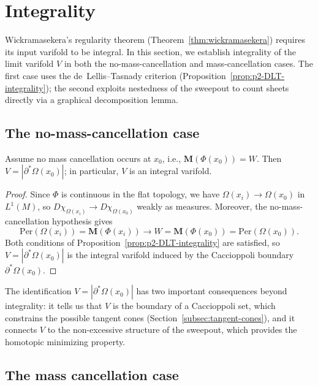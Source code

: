 
\section{Integrality}\label{sec:integrality}

Wickramasekera's regularity theorem (Theorem~\ref{thm:wickramasekera}) requires its input varifold to be integral. In this section, we establish integrality of the limit varifold $V$ in both the no-mass-cancellation and mass-cancellation cases. The first case uses the de~Lellis--Tasnady criterion (Proposition~\ref{prop:p2-DLT-integrality}); the second exploits nestedness of the sweepout to count sheets directly via a graphical decomposition lemma.

\subsection{The no-mass-cancellation case}\label{subsec:integrality-no-cancel}

\begin{theorem}\label{prop:limit-dichotomy}\label{thm:integrality-mult-one}
Assume no mass cancellation occurs at $x_0$, i.e., $\mathbf{M}(\Phi(x_0)) = W$. Then $V = |\partial^*\Omega(x_0)|$; in particular, $V$ is an integral varifold.
\end{theorem}

\begin{proof}
Since $\Phi$ is continuous in the flat topology, we have $\Omega(x_i) \to \Omega(x_0)$ in $L^1(M)$, so $D\chi_{\Omega(x_i)} \to D\chi_{\Omega(x_0)}$ weakly as measures. Moreover, the no-mass-cancellation hypothesis gives
\[
\mathrm{Per}(\Omega(x_i)) = \mathbf{M}(\Phi(x_i)) \to W = \mathbf{M}(\Phi(x_0)) = \mathrm{Per}(\Omega(x_0)).
\]
Both conditions of Proposition~\ref{prop:p2-DLT-integrality} are satisfied, so $V = |\partial^*\Omega(x_0)|$ is the integral varifold induced by the Caccioppoli boundary $\partial^*\Omega(x_0)$.
\end{proof}

The identification $V = |\partial^*\Omega(x_0)|$ has two important consequences beyond integrality: it tells us that $V$ is the boundary of a Caccioppoli set, which constrains the possible tangent cones (Section~\ref{subsec:tangent-cones}), and it connects $V$ to the non-excessive structure of the sweepout, which provides the homotopic minimizing property.

\subsection{The mass cancellation case}\label{subsec:integrality-cancel}


